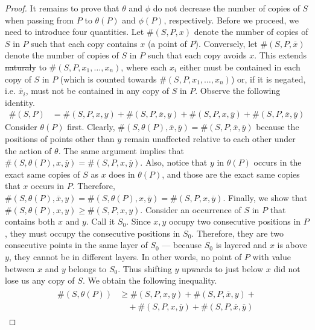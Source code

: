 \documentclass[12pt, a4paper, twoside]{report}
\providecommand{\DIFaddtex}[1]{{\protect\color{blue}\uwave{#1}}} %
\providecommand{\DIFdeltex}[1]{{\protect\color{red}\sout{#1}}}                      %
\providecommand{\DIFaddbegin}{} %
\providecommand{\DIFaddend}{} %
\providecommand{\DIFdelbegin}{} %
\providecommand{\DIFdelend}{} %
\providecommand{\DIFadd}[1]{\texorpdfstring{\DIFaddtex{#1}}{#1}} %
\providecommand{\DIFdel}[1]{\texorpdfstring{\DIFdeltex{#1}}{}} %
\begin{document}
\begin{proof}
It remains to prove that $\theta$ and $\phi$ do not decrease the number of copies of $S$ when passing from $P$ to $\theta(P)$ and $\phi(P)$, respectively. Before we proceed, we need to introduce four quantities. Let $\#(S,P,x)$ denote the number of copies of $S$ in $P$ such that each copy contains $x$ (a point of $P$). Conversely, let $\#(S,P,\overline{x})$ denote the number of copies of $S$ in $P$ such that each copy avoids $x$. This extends \DIFdelbegin \DIFdel{naturaly }\DIFdelend \DIFaddbegin \DIFadd{naturally }\DIFaddend to $\#(S,P,x_1,\ldots,x_n)$, where each $x_i$ either must be contained in each copy of $S$ in $P$ (which is counted towards $\#(S,P,x_1,\ldots,x_n)$) or, if it is negated, i.e. $\overline{x}_i$, must not be contained in any copy of $S$ in $P$. Observe the following identity.
\begin{align}
  \#(S,P) &= \#(S,P,x,y) + \#(S,P,\overline{x},y) + \#(S,P,x,\overline{y}) + \#(S,P,\overline{x},\overline{y})
\end{align}
Consider $\theta(P)$ first. Clearly, $\#(S,\theta(P), \overline{x}, \overline{y}) = \#(S,P,\overline{x},\overline{y})$ because the positions of points other than $y$ remain unaffected relative to each other under the action of $\theta$. The same argument implies that $\#(S,\theta(P),x,\overline{y}) = \#(S,P,x,\overline{y})$. Also, notice that $y$ in $\theta(P)$ occurs in the exact same copies of $S$ as $x$ does in $\theta(P)$, and those are the exact same copies that $x$ occurs in $P$. Therefore, $\#(S,\theta(P),\overline{x},y) = \#(S,\theta(P),x, \overline{y}) = \#(S,P,x,\overline{y})$. Finally, we show that $\#(S,\theta(P), x, y) \geq  \#(S,P, x, y)$. Consider an occurrence of $S$ in $P$ that contains both $x$ and $y$. Call it $S_0$. Since $x,y$ occupy two consecutive positions in $P$, they must occupy the consecutive positions in $S_0$. Therefore, they are two consecutive points in the same layer of $S_0$ --- because $S_0$ is layered and $x$ is above $y$, they cannot be in different layers. In other words, no point of $P$ with value between $x$ and $y$ belongs to $S_0$. Thus shifting $y$ upwards to just below $x$ did not lose us any copy of $S$. We obtain the following inequality.
\begin{align}
  \begin{aligned}
  \#(S,\theta(P)) &\geq \#(S,P,x,y) + \#(S,P,\overline{x},y) +\\
                  &\quad+ \#(S,P,x,\overline{y}) + \#(S,P,\overline{x},\overline{y})
                \end{aligned}

\end{align}
\end{proof}
\end{document}
